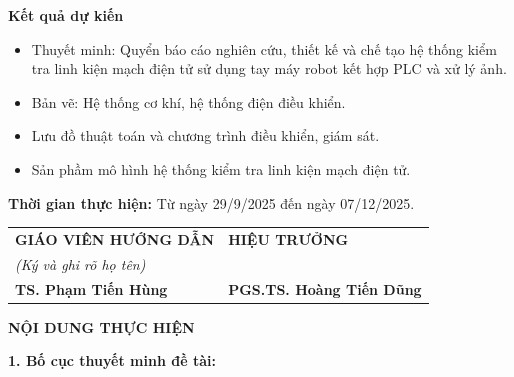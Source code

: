 \documentclass[a4paper,fontsize=14pt]{scrartcl}
\begin{document}
\vspace{0.2cm}

\textbf{Kết quả dự kiến}

\begin{itemize}[leftmargin=1cm, itemsep=0pt, parsep=0pt, topsep=0pt]
    \item Thuyết minh: Quyển báo cáo nghiên cứu, thiết kế và chế tạo hệ thống kiểm tra linh kiện mạch điện tử sử dụng tay máy robot kết hợp PLC và xử lý ảnh.
    \item Bản vẽ: Hệ thống cơ khí, hệ thống điện điều khiển.
    \item Lưu đồ thuật toán và chương trình điều khiển, giám sát.
    \item Sản phầm mô hình hệ thống kiểm tra linh kiện mạch điện tử.
\end{itemize}

\vspace{0.3cm}

\textbf{Thời gian thực hiện:} Từ ngày 29/9/2025 đến ngày 07/12/2025.

\vspace{0.5cm}

\noindent
\begin{tabular}{@{}C{7.9cm}C{7.9cm}@{}}
\textbf{GIÁO VIÊN HƯỚNG DẪN} & \textbf{HIỆU TRƯỞNG} \\
\textit{(Ký và ghi rõ họ tên)} & \\[2cm]
\textbf{TS. Phạm Tiến Hùng} & \textbf{PGS.TS. Hoàng Tiến Dũng} \\
\end{tabular}

\newpage

\begin{center}
\textbf{\large NỘI DUNG THỰC HIỆN}
\end{center}

\vspace{0.3cm}

\textbf{1. Bố cục thuyết minh đề tài:}

\vspace{0.2cm}
\end{document}

